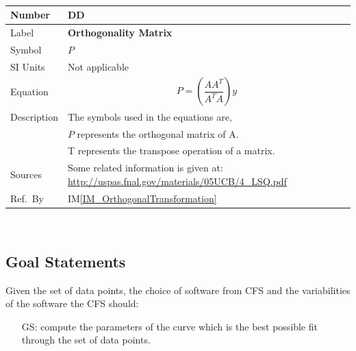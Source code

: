 \documentclass[12pt]{article}
\newcommand{\colAwidth}{0.13\textwidth}
\newcommand{\colBwidth}{0.82\textwidth}
\newcounter{defnum} %
\newcounter{datadefnum} %
\newcounter{goalnum} %
\newcommand{\iref}[1]{IM\ref{#1}}
\newcommand{\famname}{CFS} %
\begin{document}
~\newline
\noindent
\begin{minipage}{\textwidth}
	\renewcommand*{\arraystretch}{1.5}
	\begin{tabular}{| p{\colAwidth} | p{\colBwidth}|}
		\hline
		\rowcolor[gray]{0.9}
		Number
		& DD{datadefnum}\thedatadefnum \label{DD_OrthogonalityMatrix}\\
		\hline
		
		Label
		& \bf Orthogonality Matrix\\
		\hline
		
		Symbol 
		&$P$\\
		\hline
		
		SI Units 
		& Not applicable\\
		\hline
		
		Equation
		&\begin{equation*}
		P =  (\frac{A A^{T}}{A^{T} A} )  y
		\end{equation*}\\
		\hline
		
		Description 
		&The symbols used in the equations are,\\ 
		& $P$ represents the orthogonal matrix of A.\\
		& T represents the transpose operation of a matrix.\\
		
		\hline
		
		Sources
		& Some related information is given at: \url{http://uspas.fnal.gov/materials/05UCB/4_LSQ.pdf}\\
		\hline
		
		Ref.\ By 
		& \iref{IM_OrthogonalTransformation}\\
		\hline
		
	\end{tabular}
\end{minipage}\\



\subsection{Goal Statements}\label{sec_goals}

\noindent Given the set of data points, the choice of software from \famname{} and the variabilities of the software the \famname{} should:

\begin{itemize}

\item[GS\refstepcounter{goalnum}\thegoalnum \label{G_bestfit}:] compute the parameters of the curve which is the best possible fit through the set of data points.

\end{itemize}
\end{document}
